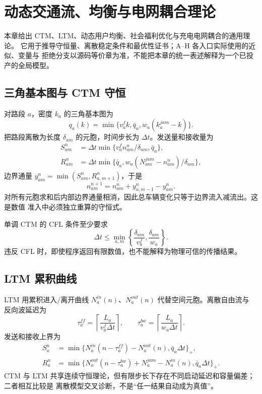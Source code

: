 \section{动态交通流、均衡与电网耦合理论}\label{sec:evpt-theory}

\begin{theorynote}
本章给出 CTM、LTM、动态用户均衡、社会福利优化与充电电网耦合的通用理论。
它用于推导守恒量、离散稳定条件和最优性证书；A--H 各入口实际使用的近似、变量与
拒绝分支以源码等价章为准，不能把本章的统一表述解释为一个已投产的全局模型。
\end{theorynote}

\subsection{三角基本图与 CTM 守恒}
对路段 $a$，密度 $k_a$ 的三角基本图为
\begin{equation}
 q_a(k)=\min\{v_a^f k,\bar q_a,w_a(k_a^{jam}-k)\}.
\end{equation}
把路段离散为长度 $\delta_{am}$ 的元胞，时间步长为 $\Delta t$。发送量和接收量为
\begin{align}
 S_{am}^n&=\Delta t\min\{v_a^f n_{am}^n/\delta_{am},\bar q_a\},\\
 R_{am}^n&=\Delta t\min\{\bar q_a,w_a(N_{am}^{jam}-n_{am}^n)/\delta_{am}\},
\end{align}
边界通量 $y_{am}^n=\min(S_{am}^n,R_{a,m+1}^n)$，于是
\begin{equation}
 n_{am}^{n+1}=n_{am}^n+y_{a,m-1}^n-y_{am}^n.
\end{equation}
对所有元胞求和后内部边界通量相消，因此总车辆变化只等于边界流入减流出。这是数值
准入中必须独立重算的守恒式。

单调 CTM 的 CFL 条件至少要求
\begin{equation}
 \Delta t\le\min_{a,m}\left\{\frac{\delta_{am}}{v_a^f},
 \frac{\delta_{am}}{w_a}\right\}.
\end{equation}
违反 CFL 时，即使程序返回有限数值，也不能解释为物理可信的传播结果。

\subsection{LTM 累积曲线}
LTM 用累积进入/离开曲线 $N_a^{in}(n)$、$N_a^{out}(n)$ 代替空间元胞。离散自由流与
反向波延迟为
\begin{equation}
 \tau_a^{ff}=\left\lceil\frac{L_a}{v_a^f\Delta t}\right\rceil,
 \qquad
 \tau_a^{bw}=\left\lceil\frac{L_a}{w_a\Delta t}\right\rceil.
\end{equation}
发送和接收上界为
\begin{align}
 S_a^n&=\min\{N_a^{in}(n-\tau_a^{ff})-N_a^{out}(n),\bar q_a\Delta t\}_+,\\
 R_a^n&=\min\{N_a^{out}(n-\tau_a^{bw})+N_a^{jam}-N_a^{in}(n),
                    \bar q_a\Delta t\}_+.
\end{align}
CTM 与 LTM 共享连续守恒理论，但有限步长下存在不同启动延迟和容量偏差；二者相互比较是
离散模型交叉诊断，不是“任一结果自动成为真值”。

